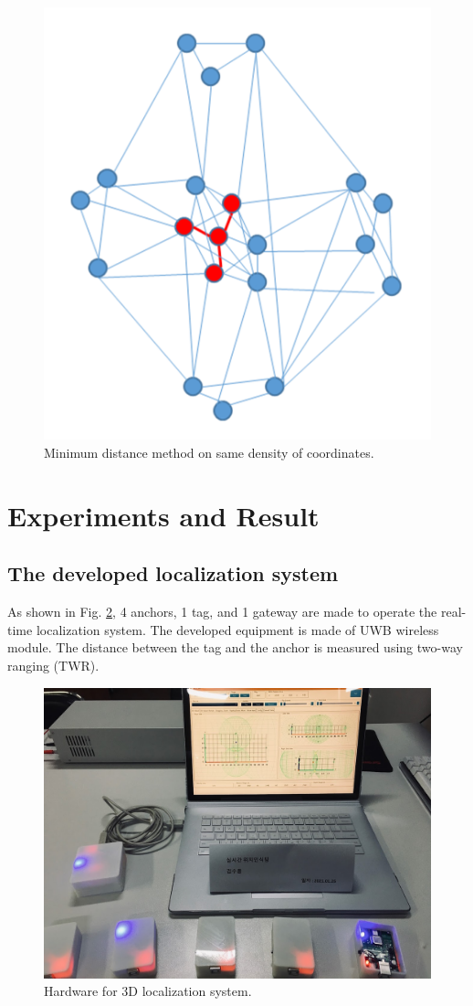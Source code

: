 \documentclass[conference]{IEEEtran}
\begin{document}
\begin{figure}[htbp]
    \centerline{\includegraphics[width=0.62\columnwidth]{fig4.png}}
    \caption{Minimum distance method on same density of coordinates.}
    \label{fig4}
\end{figure}

\section{Experiments and Result}
\subsection{The developed localization system}

As shown in Fig. \ref{fig10}, 4 anchors, 1 tag, and 1 gateway are made to operate the real-time localization system. The developed equipment is made of UWB wireless module. The distance between the tag and the anchor is measured using two-way ranging (TWR).

\begin{figure}[htbp]
    \centerline{\includegraphics[width=0.62\columnwidth]{fig10.jpg}}
    \caption{Hardware for 3D localization system.}
    \label{fig10}
\end{figure}
\end{document}
